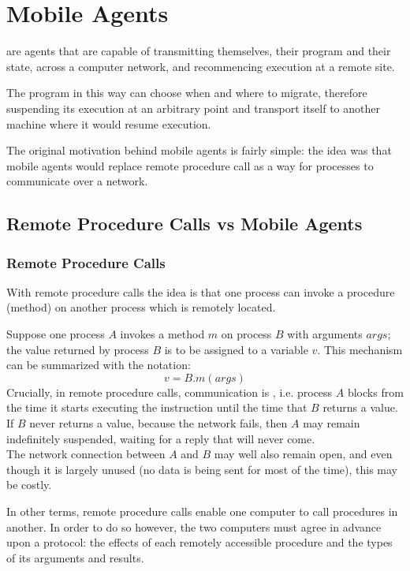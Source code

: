 \chapter{Mobile Agents}
\minitoc

 are agents that are capable of transmitting themselves, their program and their state, across a computer network, and recommencing execution at a remote site.

The program in this way can choose when and where to migrate, therefore suspending its execution at an arbitrary point and transport itself to another machine where it would resume execution.

The original motivation behind mobile agents is fairly simple: the idea was that mobile agents would replace remote procedure call as a way for processes to communicate over a network.\\



\section{Remote Procedure Calls vs Mobile Agents}
\subsection{Remote Procedure Calls}

With remote procedure calls the idea is that one process can invoke a procedure (method) on another process which is remotely located.

Suppose one process $A$ invokes a method $m$ on process $B$ with arguments $args$; the value returned by process $B$ is to be assigned to a variable $v$. This mechanism can be summarized with the notation:
\[v = B.m(args)\]
Crucially, in remote procedure calls, communication is , i.e. process $A$ blocks from the time it starts executing the instruction until the time that $B$ returns a value. If $B$ never returns a value, because the network fails, then $A$ may remain indefinitely suspended, waiting for a reply that will never come.\\
The network connection between $A$ and $B$ may well also remain open, and even though it is largely unused (no data is being sent for most of the time), this may be costly.

In other terms, remote procedure calls enable one computer to call procedures in another. In order to do so however, the two computers must agree in advance upon a protocol: the effects of each remotely accessible procedure and the types of its arguments and results.

